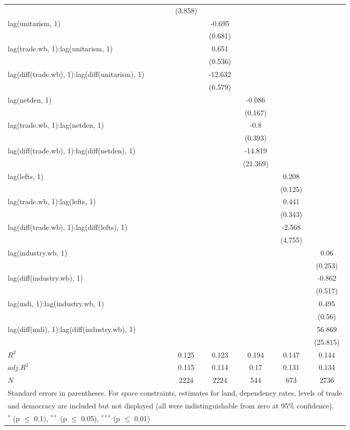 \begin{table}[htbp]
\begin{tabular}{l*{5}{c}}
  		&(3.858) 		& 		& 		& 		& \\
lag(unitarism, 1) 		& 		&-0.695 		& 		& 		& \\
  		& 		&(0.681) 		& 		& 		& \\
lag(trade.wb, 1):lag(unitarism, 1) 		& 		&0.651 		& 		& 		& \\
  		& 		&(0.536) 		& 		& 		& \\
lag(diff(trade.wb), 1):lag(diff(unitarism), 1) 		& 		&-12.632\sym{*} 		& 		& 		& \\
  		& 		&(6.579) 		& 		& 		& \\
lag(netden, 1) 		& 		& 		&-0.086 		& 		& \\
  		& 		& 		&(0.167) 		& 		& \\
lag(trade.wb, 1):lag(netden, 1) 		& 		& 		&-0.8\sym{**} 		& 		& \\
  		& 		& 		&(0.393) 		& 		& \\
lag(diff(trade.wb), 1):lag(diff(netden), 1) 		& 		& 		&-14.819 		& 		& \\
  		& 		& 		&(21.369) 		& 		& \\
lag(lefts, 1) 		& 		& 		& 		&0.208\sym{*} 		& \\
  		& 		& 		& 		&(0.125) 		& \\
lag(trade.wb, 1):lag(lefts, 1) 		& 		& 		& 		&0.441 		& \\
  		& 		& 		& 		&(0.343) 		& \\
lag(diff(trade.wb), 1):lag(diff(lefts), 1) 		& 		& 		& 		&-2.568 		& \\
  		& 		& 		& 		&(4.755) 		& \\
lag(industry.wb, 1) 		& 		& 		& 		& 		&0.06 \\
  		& 		& 		& 		& 		&(0.253) \\
lag(diff(industry.wb), 1) 		& 		& 		& 		& 		&-0.862\sym{*} \\
  		& 		& 		& 		& 		&(0.517) \\
lag(mdi, 1):lag(industry.wb, 1) 		& 		& 		& 		& 		&0.495 \\
  		& 		& 		& 		& 		&(0.56) \\
lag(diff(mdi), 1):lag(diff(industry.wb), 1) 		& 		& 		& 		& 		&56.869\sym{**} \\
  		& 		& 		& 		& 		&(25.815) \\
\hline
$R^2$ 		&0.125 		&0.123 		&0.194 		&0.147 		&0.144 \\
$adj.R^2$ 		&0.115 		&0.114 		&0.17 		&0.131 		&0.134 \\
$N$ 		&\multicolumn{1}{c}{2224} 		&\multicolumn{1}{c}{2224} 		&\multicolumn{1}{c}{544} 		&\multicolumn{1}{c}{673} 		&\multicolumn{1}{c}{2736} \\
\hline\hline
\multicolumn{6}{l}{\footnotesize Standard errors in parentheses. For space constraints, estimates for land, dependency rates, levels of trade}\\
\multicolumn{6}{l}{\footnotesize and democracy are included but not displayed (all were indistinguishable from zero at 95\% confidence).}\\
\multicolumn{6}{l}{\footnotesize $^{*}$ (p $\le$ 0.1), $^{**}$ (p $\le$ 0.05), $^{***}$ (p $\le$ 0.01)}\\
\end{tabular}
\end{table}
